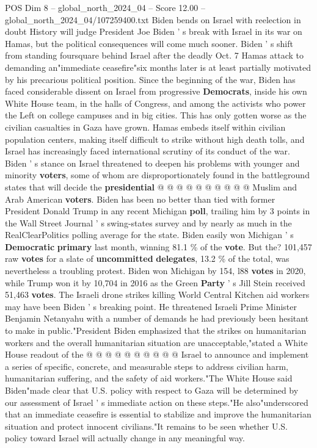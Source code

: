 \begin{textsample}{POS Dim 8 – global\_north\_2024\_04 – Score 12.00 – global\_north\_2024\_04/107259400.txt}  \label{ex:f8_pos_056}
Biden bends on Israel with reelection in doubt History will judge President Joe Biden ' s break with Israel in its war on Hamas, but the political consequences will come much sooner.
Biden ' s shift from standing foursquare behind Israel after the deadly Oct. 7 Hamas attack to demanding an"immediate ceasefire"six months later is at least partially motivated by his precarious political position.
Since the beginning of the war, Biden has faced considerable dissent on Israel from progressive \textbf{Democrats}, inside his own White House team, in the halls of Congress, and among the activists who power the Left on college campuses and in big cities.
This has only gotten worse as the civilian casualties in Gaza have grown.
Hamas embeds itself within civilian population centers, making itself difficult to strike without high death tolls, and Israel has increasingly faced international scrutiny of its conduct of the war.
Biden ' s stance on Israel threatened to deepen his problems with younger and minority \textbf{voters}, some of whom are disproportionately found in the battleground states that will decide the \textbf{presidential} @ @ @ @ @ @ @ @ @ @ Muslim and Arab American \textbf{voters}.
Biden has been no better than tied with former President Donald Trump in any recent Michigan \textbf{poll}, trailing him by 3 points in the Wall Street Journal ' s swing-states survey and by nearly as much in the RealClearPolitics polling average for the state.
Biden easily won Michigan ' s \textbf{Democratic} \textbf{primary} last month, winning 81.1 \% of the \textbf{vote}.
But the? 101,457 raw \textbf{votes} for a slate of \textbf{uncommitted} \textbf{delegates}, 13.2 \% of the total, was nevertheless a troubling protest.
Biden won Michigan by 154, l88 \textbf{votes} in 2020, while Trump won it by 10,704 in 2016 as the Green \textbf{Party} ' s Jill Stein received 51,463 \textbf{votes}.
The Israeli drone strikes killing World Central Kitchen aid workers may have been Biden ' s breaking point.
He threatened Israeli Prime Minister Benjamin Netanyahu with a number of demands he had previously been hesitant to make in public."President Biden emphasized that the strikes on humanitarian workers and the overall humanitarian situation are unacceptable,"stated a White House readout of the @ @ @ @ @ @ @ @ @ @ Israel to announce and implement a series of specific, concrete, and measurable steps to address civilian harm, humanitarian suffering, and the safety of aid workers."The White House said Biden"made clear that U.S. policy with respect to Gaza will be determined by our assessment of Israel ' s immediate action on these steps."He also"underscored that an immediate ceasefire is essential to stabilize and improve the humanitarian situation and protect innocent civilians."It remains to be seen whether U.S. policy toward Israel will actually change in any meaningful way.

\end{textsample}

